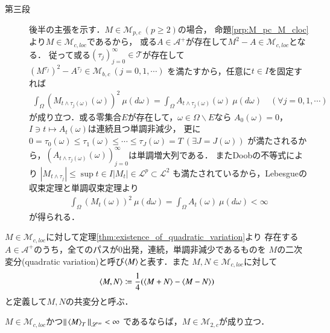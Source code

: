 \begin{prf}
\begin{description}
			\item[第三段]
				後半の主張を示す．$M \in \mathcal{M}_{p,c}\ (p \geq 2)$の場合，
				命題\ref{prp:M_pc_M_cloc}より$M \in \mathcal{M}_{c,loc}$であるから，
				或る$A \in \mathcal{A}^+$が存在して$M^2 - A \in \mathcal{M}_{c,loc}$となる．
				従って或る$(\tau_j)_{j=0}^{\infty} \in \mathcal{T}$が存在して
				$\left(M^{\tau_j} \right)^2 - A^{\tau_j} \in \mathcal{M}_{b,c}\ (j=0,1,\cdots)$
				を満たすから，任意に$t \in I$を固定すれば
				\begin{align}
					\int_{\Omega} \left( M_{t \wedge \tau_j(\omega)}(\omega) \right)^2\ \mu(d\omega)
					= \int_{\Omega} A_{t \wedge \tau_j(\omega)}(\omega)\ \mu(d\omega)
					\quad (\forall j=0,1,\cdots)
				\end{align}
				が成り立つ．或る零集合$E$が存在して，$\omega \in \Omega \backslash E$なら
				$A_0(\omega) = 0$，$I \ni t \longmapsto A_t(\omega)$は連続且つ単調非減少，
				更に$0 = \tau_0(\omega) \leq \tau_1(\omega) \leq \cdots \leq \tau_{J}(\omega) = T\ (\exists J = J(\omega))$
				が満たされるから，$\left(A_{t \wedge \tau_j(\omega)}(\omega)\right)_{j=0}^{\infty}$は単調増大列である．
				またDoobの不等式により
				$\left| M_{t \wedge \tau_j} \right| \leq \sup{t \in I}{|M_t|} \in \mathscr{L}^p \subset \mathscr{L}^2$
				も満たされているから，Lebesgueの収束定理と単調収束定理より
				\begin{align}
					\int_{\Omega} \left( M_t(\omega) \right)^2\ \mu(d\omega)
					= \int_{\Omega} A_t(\omega)\ \mu(d\omega) < \infty
				\end{align}
				が得られる．
		\end{description}
	\end{prf}
	
	\begin{screen}
		\begin{dfn}[二次変分]
			$M \in \mathcal{M}_{c,loc}$に対して定理\ref{thm:existence_of_quadratic_variation}より
			存在する$A \in \mathcal{A}^+$のうち，全てのパスが$0$出発，連続，単調非減少であるものを
			$M$の二次変分(quadratic variation)と呼び$\inprod<M>$と表す．また
			$M,N \in \mathcal{M}_{c,loc}$に対して
			\begin{align}
				\inprod<M,N> \coloneqq \frac{1}{4} (\inprod<M+N> - \inprod<M-N>)
			\end{align}
			と定義して$M,N$の共変分と呼ぶ．
		\end{dfn}
	\end{screen}
	
	\begin{screen}
		\begin{thm}[二次変分が有界な局所マルチンゲールは二乗可積分マルチンゲール]
			$M \in \mathcal{M}_{c,loc}$かつ$\Norm{\inprod<M>_T}{\mathscr{L}^{\infty}} < \infty$
			であるならば，$M \in \mathcal{M}_{2,c}$が成り立つ．
			\label{thm:quadratic_variation_bounded_then_M_2c}
		\end{thm}
	\end{screen}
	
